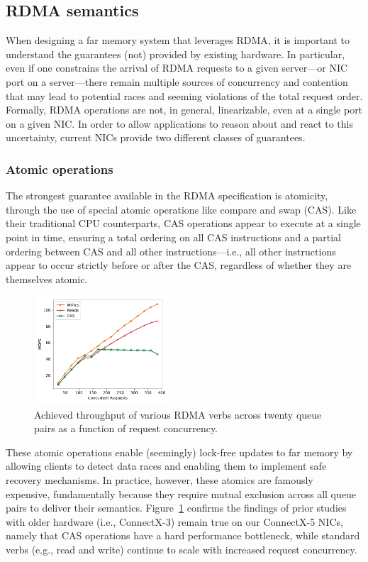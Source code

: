 \subsection{RDMA semantics}


When designing a far memory system that leverages RDMA, it is
important to understand the guarantees (not) provided by existing hardware.
In particular, even if one constrains the arrival of RDMA requests to
a given server---or NIC port on a server---there remain multiple
sources of concurrency and contention that may lead to potential races
and seeming violations of the total request order.  Formally, RDMA
operations are not, in general, linearizable, even at a single port on
a given NIC.  In order to allow applications to reason about and react
to this uncertainty, current NICs provide two different classes of
guarantees.

\subsubsection{Atomic operations}

The strongest guarantee available in the RDMA specification is
atomicity, through the use of special atomic operations like compare
and swap (CAS).  Like their traditional CPU counterparts, CAS
operations appear to execute at a single point in time, ensuring a
total ordering on all CAS instructions and a partial ordering between
CAS and all other instructions---i.e., all other instructions appear
to occur strictly before or after the CAS, regardless of whether they
are themselves atomic.

\begin{figure}[t]
    \includegraphics[width=0.45\textwidth]{fig/rdma_concur.pdf}
    \caption{Achieved throughput of various RDMA verbs across twenty queue pairs as a function of request concurrency.}
    \label{fig:rdma_concur}
\end{figure}

These atomic operations enable (seemingly) lock-free updates to far
memory by allowing clients to detect data races and enabling them to
implement safe recovery mechanisms. In practice, however, these
atomics are famously~\cite{design-guidelines,clover} expensive,
fundamentally because they require mutual exclusion across all queue
pairs to deliver their semantics.  Figure~\ref{fig:rdma_concur}
confirms the findings of prior
studies~\cite[Fig. 14]{design-guidelines} with older hardware (i.e.,
ConnectX-3) remain true on our ConnectX-5 NICs, namely that CAS
operations have a hard performance bottleneck, while standard verbs
(e.g., read and write) continue to scale with increased request
concurrency.

